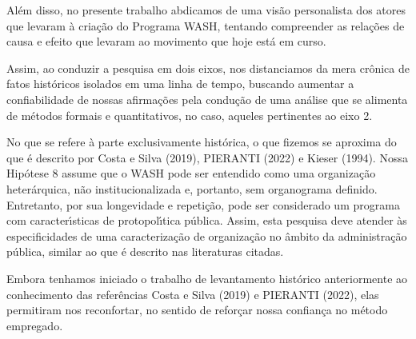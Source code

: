 \documentclass[
12pt,		%
openright,	%
twoside,  %
a4paper,			%
chapter=TITLE,		%
english,			%
french,				%
spanish,			%
brazil				%
]{USPSC-classe/USPSC}
\begin{document}
Al\'em disso, no presente trabalho abdicamos de uma vis\~ao personalista dos atores que levaram \`a cria\c{c}\~ao do Programa WASH, tentando compreender as rela\c{c}\~oes de causa e efeito que levaram ao movimento que hoje est\'a em curso.

















Assim, ao conduzir a pesquisa em dois eixos, nos distanciamos da mera cr\^onica de fatos hist\'oricos isolados em uma linha de tempo, buscando aumentar a confiabilidade de nossas afirma\c{c}\~oes pela condu\c{c}\~ao de uma an\'alise que se alimenta de m\'etodos formais e quantitativos, no caso, aqueles pertinentes ao eixo 2.

















No que se refere \`a parte exclusivamente hist\'orica, o que fizemos se aproxima do que \'e descrito por   Costa e Silva (2019), PIERANTI (2022) e  Kieser (1994). Nossa Hip\'otese 8 assume que o WASH pode ser entendido como uma organiza\c{c}\~ao heter\'arquica, n\~ao institucionalizada e, portanto, sem organograma definido. Entretanto, por sua longevidade e repeti\c{c}\~ao, pode ser considerado um programa com caracter\'{\i}sticas de protopol\'{\i}tica p\'ublica. Assim, esta pesquisa deve atender \`as especificidades de uma caracteriza\c{c}\~ao de organiza\c{c}\~ao no \^ambito da administra\c{c}\~ao p\'ublica, similar ao que \'e descrito nas literaturas citadas.

















Embora tenhamos iniciado o trabalho de levantamento hist\'orico anteriormente ao conhecimento das refer\^encias  Costa e Silva (2019) e  PIERANTI (2022), elas permitiram nos reconfortar, no sentido de refor\c{c}ar nossa confian\c{c}a no m\'etodo empregado.
\end{document}
